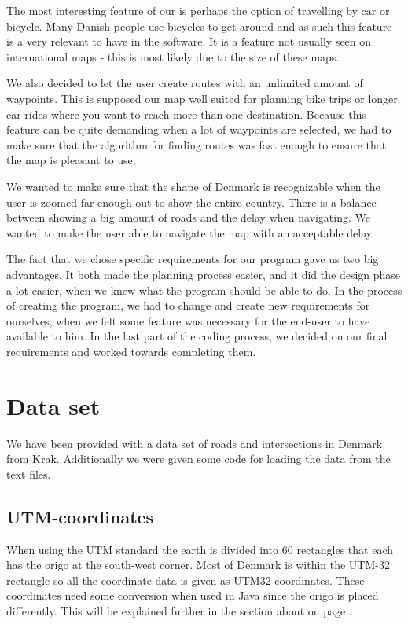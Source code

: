 The most interesting feature of our  is perhaps the
option of travelling by car or bicycle. Many Danish
people use bicycles to get around and as such this feature is a very relevant
to have in the software. It is a feature not usually seen on
international maps - this is most likely due to the size of these maps.

We also decided to let the user create routes with an unlimited amount of
waypoints. This is supposed our map well suited for planning bike trips or
longer car rides where you want to reach more than one destination. Because this
feature can be quite demanding when a lot of waypoints are selected, we had to
make sure that the algorithm for finding routes was fast enough to ensure that the 
map is pleasant to use.

We wanted to make sure that the shape of Denmark is recognizable when
the user is zoomed far enough out to show the entire country. There is a balance between
showing a big amount of roads and the delay when navigating. We wanted to make
the user able to navigate the map with an acceptable delay. 

The fact that we chose specific requirements for our program gave us two big
advantages. It both made the planning process easier, and it did the design phase a lot 
easier, when we knew what the program should be able to do. In the process of creating the
program, we had to change and create new requirements for ourselves, when we
felt some feature was necessary for the end-user to have available to him. In
the last part of the coding process, we decided on our final requirements and worked towards completing them. 

\section{Data set}
\label{BG-DS}
We have been provided with a data set of roads and intersections in Denmark 
from Krak. Additionally we were given some code for loading the data from the 
text files.

\subsection{UTM-coordinates}
\label{BG-DS-UTM}
When using the UTM standard the earth is divided into 60 rectangles that each 
has the origo at the south-west corner. Most of Denmark is within the UTM-32 
rectangle so all the coordinate data is given as UTM32-coordinates.
These coordinates need some conversion when used in Java since the origo is placed 
differently. This will be explained further in the section about 
on page \pageref{UTM-conversion}.

